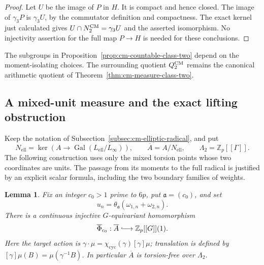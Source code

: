 \documentclass[11pt]{article}
\newtheorem{lemma}[theorem]{Lemma}
\theoremstyle{definition}\newtheorem{definition}[theorem]{Definition}
\begin{document}
\begin{proof}
Let \(U\) be the image of \(P\) in \(H\).  It is compact
and hence closed.  The image of \(\gamma_3P\) is
\(\gamma_3U\), by the commutator definition and
compactness.  The exact kernel just calculated gives
\(U\cap N_2^{\rm CM}=\gamma_3U\) and the asserted
isomorphism.  No injectivity assertion for the full
map \(P\to H\) is needed for these conclusions.
\end{proof}

The subgroups in Proposition~\ref{prop:cm-countable-class-two}
depend on the moment-isolating choices.  The surrounding
quotient \(Q_2^{\rm CM}\) remains the canonical arithmetic
quotient of Theorem~\ref{thm:cm-measure-class-two}.


\subsection{A mixed-unit measure and the exact lifting obstruction}
\label{subsec:cm-nonabelian-gate}

Keep the notation of Subsection~\ref{subsec:cm-elliptic-radical}, and put
\[
 N_{\mathrm{ell}}=\ker\!\left(A\longrightarrow
                  \operatorname{Gal}(L_{\mathrm{ell}}/L_\infty)\right),
 \qquad \overline A=A/N_{\mathrm{ell}},\qquad
 \Lambda_2=\mathbb Z_p[[\Gamma]].
\]
The following construction uses only the mixed torsion points whose
two coordinates are units.  The passage from its moments to the
full radical is justified by an explicit scalar formula, including
the two boundary families of weights.

\begin{lemma}\label{lem:cm-mixed-measure-embedding}
Fix an integer \(c_0>1\) prime to \(6p\), put
\(\mathfrak a=(c_0)\), and set
\[
 u_n=\theta_{\mathfrak a}(\omega_{1,n}+\omega_{2,n}).
\]
There is a continuous injective \(G\)-equivariant homomorphism
\[
 \overline\Phi_{c_0}:\overline A
            \lhook\joinrel\longrightarrow \mathbb Z_p[[G]](1).
\]
Here the target action is
\(\gamma\cdot\mu=\chi_{\mathrm{cyc}}(\gamma)[\gamma]\mu\);
translation is defined by
\([\gamma]\mu(B)=\mu(\gamma^{-1}B)\).
In particular \(\overline A\) is torsion-free over \(\Lambda_2\).
\end{lemma}
\end{document}

